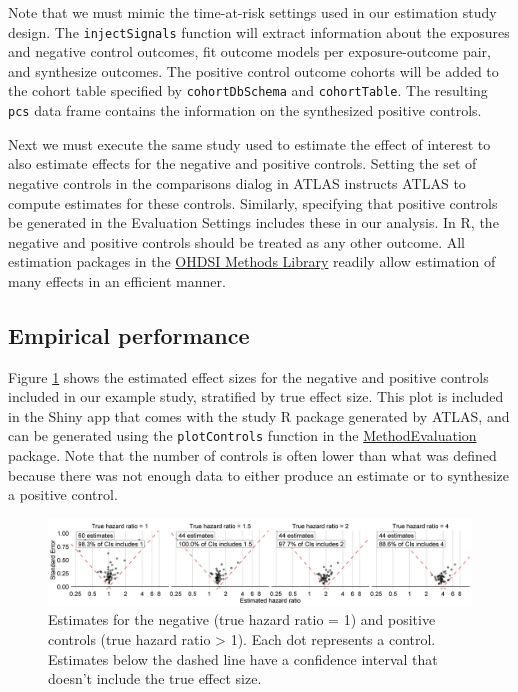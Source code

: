 \documentclass[11pt]{book}
\theoremstyle{definition}
\theoremstyle{definition}
\theoremstyle{definition}
\theoremstyle{remark}
\begin{document}
Note that we must mimic the time-at-risk settings used in our estimation study design. The \texttt{injectSignals} function will extract information about the exposures and negative control outcomes, fit outcome models per exposure-outcome pair, and synthesize outcomes. The positive control outcome cohorts will be added to the cohort table specified by \texttt{cohortDbSchema} and \texttt{cohortTable}. The resulting \texttt{pcs} data frame contains the information on the synthesized positive controls.

Next we must execute the same study used to estimate the effect of interest to also estimate effects for the negative and positive controls. Setting the set of negative controls in the comparisons dialog in ATLAS instructs ATLAS to compute estimates for these controls. Similarly, specifying that positive controls be generated in the Evaluation Settings includes these in our analysis. In R, the negative and positive controls should be treated as any other outcome. All estimation packages in the \href{https://ohdsi.github.io/MethodsLibrary/}{OHDSI Methods Library} readily allow estimation of many effects in an efficient manner.

\hypertarget{empirical-performance}{%
\subsection{Empirical performance}\label{empirical-performance}}

Figure \ref{fig:controls} shows the estimated effect sizes for the negative and positive controls included in our example study, stratified by true effect size. This plot is included in the Shiny app that comes with the study R package generated by ATLAS, and can be generated using the \texttt{plotControls} function in the \href{https://ohdsi.github.io/MethodEvaluation/}{MethodEvaluation} package. Note that the number of controls is often lower than what was defined because there was not enough data to either produce an estimate or to synthesize a positive control.

\begin{figure}

{\centering \includegraphics[width=1\linewidth]{images/MethodValidity/controls} 

}

\caption{Estimates for the negative (true hazard ratio = 1) and positive controls (true hazard ratio > 1). Each dot represents a control. Estimates below the dashed line have a confidence interval that doesn't include the true effect size.}\label{fig:controls}
\end{figure}
\end{document}
